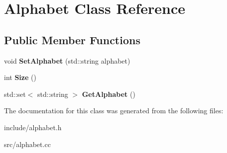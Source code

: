 \hypertarget{classAlphabet}{}\section{Alphabet Class Reference}
\label{classAlphabet}
\subsection*{Public Member Functions}
\begin{DoxyCompactItemize}
\item 
\mbox{\label{classAlphabet_a2a61d36e511d77704215dce942847ed9}} 
void {\bfseries Set\+Alphabet} (std\+::string alphabet)
\item 
\mbox{\label{classAlphabet_a154f45f063a75a8116e8f9022440287e}} 
int {\bfseries Size} ()
\item 
\mbox{\label{classAlphabet_aa27c86b98daa058dc4f299b13c76ee8b}} 
std\+::set$<$ std\+::string $>$ {\bfseries Get\+Alphabet} ()
\end{DoxyCompactItemize}


The documentation for this class was generated from the following files\+:\begin{DoxyCompactItemize}
\item 
include/alphabet.\+h\item 
src/alphabet.\+cc\end{DoxyCompactItemize}

